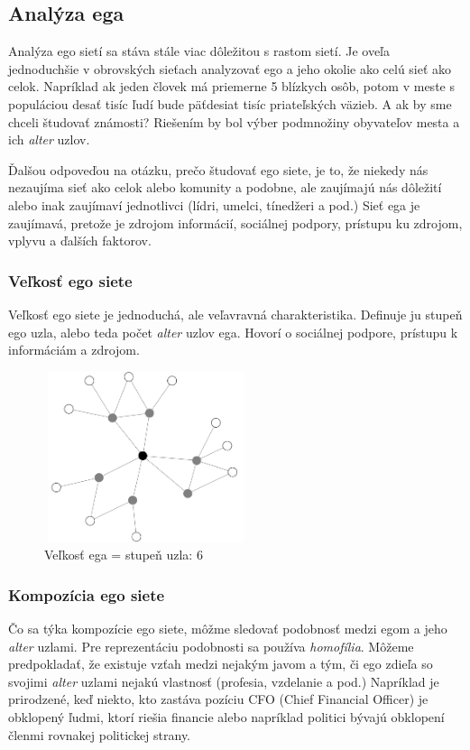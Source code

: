 \documentclass[slovak,master,public,dept460,male,cpdeclaration,oneside]{diploma}
\begin{document}
\subsection{Analýza ega}
Analýza ego sietí sa stáva stále viac dôležitou s rastom sietí. Je oveľa jednoduchšie v obrovských sieťach analyzovať ego a jeho okolie ako celú sieť ako celok. Napríklad ak jeden človek má priemerne 5 blízkych osôb, potom v meste s populáciou desať tisíc ľudí bude päťdesiat tisíc priateľských väzieb. A ak by sme chceli študovať známosti? Riešením by bol výber podmnožiny obyvateľov mesta a ich \textit{alter} uzlov.


Ďalšou odpoveďou na otázku, prečo študovať ego siete, je to, že niekedy nás nezaujíma sieť ako celok alebo komunity a podobne, ale zaujímajú nás dôležití alebo inak zaujímaví jednotlivci (lídri, umelci, tínedžeri a pod.) Sieť ega je zaujímavá, pretože je zdrojom informácií, sociálnej podpory, prístupu ku zdrojom, vplyvu a ďalších faktorov.

\subsubsection{Veľkosť ego siete}
Veľkosť ego siete je jednoduchá, ale veľavravná charakteristika. Definuje ju stupeň ego uzla, alebo teda počet \textit{alter} uzlov ega. Hovorí o sociálnej podpore, prístupu k informáciám a  zdrojom.\cite{22}


\begin{figure}[H]
\centering
\includegraphics[width=6cm, height=5cm]{figures/egonet}
\caption{Veľkosť ega = stupeň uzla: 6}
\end{figure}

\subsubsection{Kompozícia ego siete}
Čo sa týka kompozície ego siete, môžme sledovať podobnosť medzi egom a jeho \textit{alter} uzlami. Pre reprezentáciu podobnosti sa používa \textit{homofília}. Môžeme predpokladať, že existuje vzťah medzi nejakým javom a tým, či ego zdieľa so svojimi \textit{alter} uzlami nejakú vlastnosť (profesia, vzdelanie a pod.) Napríklad je prirodzené, keď niekto, kto zastáva pozíciu CFO (Chief Financial Officer) je obklopený ľudmi, ktorí riešia financie alebo napríklad politici bývajú obklopení členmi rovnakej politickej strany. 
\end{document}
